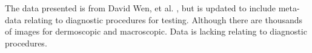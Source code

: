 
The data presented is from David Wen, et al. \cite{Wen2022}, but is updated to include meta-data relating to diagnostic procedures for testing. Although there are thousands of images for dermoscopic and macroscopic. Data is lacking relating to diagnostic procedures.